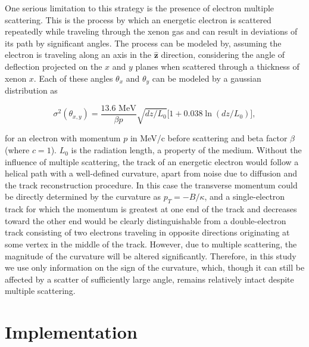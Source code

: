\documentclass{JINST}
\begin{document}
One serious limitation to this strategy is the presence of electron multiple scattering.  This is the process by which
an energetic electron is scattered repeatedly while traveling through the xenon gas and can result in deviations of its
path by significant angles.  The process can be modeled by, assuming the electron is traveling along an axis in the $\hat{\mathbf{z}}$ direction, considering the angle of deflection projected on the $x$ and $y$ planes when scattered
through a thickness of xenon $x$.  Each of these angles $\theta_x$ and $\theta_y$ can be modeled by a gaussian 
distribution as

\begin{equation}\label{eqn_mscat}
\sigma^{2}(\theta_{x,y}) = \frac{13.6\,\,\mathrm{MeV}}{\beta p}\sqrt{dz/L_{0}}\bigl[1 + 0.038\ln(dz/L_{0})\bigr],
\end{equation}

\noindent for an electron with momentum $p$ in MeV/c before scattering and beta factor $\beta$ (where $c = 1$).
$L_{0}$ is the radiation length, a property of the medium.  Without the influence of multiple scattering, the track of
an energetic electron would follow a helical path with a well-defined curvature, apart from noise due to diffusion and
the track reconstruction procedure.  In this case the transverse momentum could be directly determined by the
curvature as $p_{T} = -B/\kappa$, and a single-electron track for which the momentum is greatest at one end of the
track and decreases toward the other end would be clearly distinguishable
from a double-electron track consisting of two electrons traveling in opposite directions originating at some vertex
in the middle of the track.  However, due to multiple scattering, the magnitude of the curvature will be altered
significantly.  Therefore, in this study we use only information on the sign of the curvature, which, though it can still
be affected by a scatter of sufficiently large angle, remains relatively intact despite multiple scattering.

\section{Implementation}\label{sec:implementation}
\end{document}
